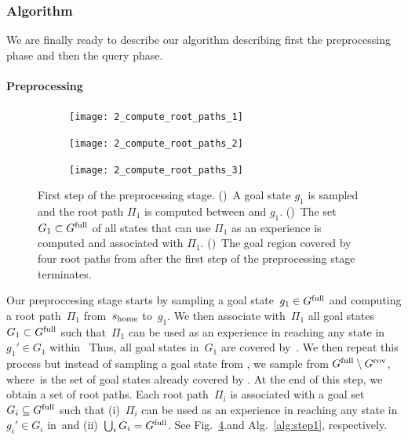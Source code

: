 \documentclass[a4paper,10pt]{article}
\begin{document}
\subsubsection{Algorithm}
We are finally ready to describe our algorithm describing first the preprocessing phase and then the query phase.

\paragraph{Preprocessing}
\begin{figure}[t]
    \centering
    \begin{subfigure}{.45\textwidth}
        \texttt{[image: 2\_compute\_root\_paths\_1]}
        \caption{}
        \label{fig:crp1}
    \end{subfigure}
    \hspace{4mm}
    \begin{subfigure}{0.45\textwidth}
        \texttt{[image: 2\_compute\_root\_paths\_2]}
        \caption{}
        \label{fig:crp2}
    \end{subfigure}
    \hspace{4mm}
    \begin{subfigure}{0.45\textwidth}
        \texttt{[image: 2\_compute\_root\_paths\_3]}
        \caption{}
        \label{fig:crp3}
    \end{subfigure}
    \caption{\CaptionTextSize
    First step of the preprocessing stage.
    ()~A goal state $g_1$ is sampled and the root path $\Pi_1$ is computed between \Shome and $g_1$.
    ()~The set $G_1 \subset G^{\textrm{full}}$ of all states that can use $\Pi_1$ as an experience is computed and associated with $\Pi_1$.
    ()~The goal region covered by four root paths from \Shome after the first step of the preprocessing stage terminates.
    }
    \label{fig:crp}
    \vspace{-5mm}
\end{figure}
Our preproccesing stage starts by sampling a goal state~$g_1 \in G^{\textrm{full}}$ and computing a root path~$\Pi_1$ from~$s_{\textrm{home}}$ to~$g_1$. We then associate with~$\Pi_1$ all goal states~$G_1 \subset G^{\textrm{full}}$ such that~$\Pi_1$ can be used as an experience in reaching any state in $g_1' \in G_1$ within~\Tbound
Thus, all goal states in~$G_1$ are covered by~\Shome.
%
We then repeat this process but instead of sampling  a goal state from \Gfull, we sample from $G^{\textrm{full}} \setminus G^{\textrm{cov}}$, where~\Gcov is the set of goal states already covered by \Shome.
At the end of this step, we obtain a set of root paths. 
Each root path~$\Pi_i$ is associated with a goal set $G_i \subseteq G^{\textrm{full}}$ such that 
(i)~$\Pi_i$ can be used as an experience in reaching any state in $g_i' \in G_i$ in~\Tbound and 
(ii)~$\bigcup_i G_i = G^{\textrm{full}}$.
%
See Fig.~\ref{fig:crp}.and  Alg.~\ref{alg:step1}, respectively.
\end{document}
